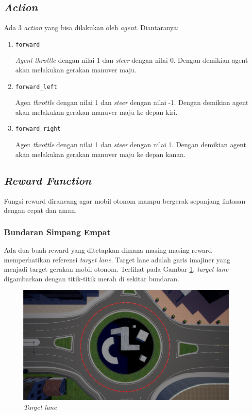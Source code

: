 \documentclass[conference]{IEEEtran}
\begin{document}
\subsection{\textit{Action}}
\label{sec:action}
Ada 3 \textit{action} yang bisa dilakukan oleh \textit{agent}. Diantaranya:

\begin{enumerate}[nolistsep]
	\item \verb=forward=
	
	\textit{Agent} \textit{throttle} dengan nilai 1 dan \textit{steer} dengan nilai 0. Dengan demikian agent akan melakukan gerakan manuver maju.
	
	\item \verb=forward_left=
	
	Agen \textit{throttle} dengan nilai 1 dan \textit{steer} dengan nilai -1. Dengan demikian agent akan melakukan gerakan manuver maju ke depan kiri.
	
	\item \verb=forward_right=
	
	Agen \textit{throttle} dengan nilai 1 dan \textit{steer} dengan nilai 1. Dengan demikian agent akan melakukan gerakan manuver maju ke depan kanan.
	
\end{enumerate}

\subsection{\textit{Reward Function}}
\label{sec:sistem_reward}

Fungsi reward dirancang agar mobil otonom mampu bergerak sepanjang lintasan dengan cepat dan aman.

\subsubsection{Bundaran Simpang Empat}Ada dua buah reward yang ditetapkan dimana masing-masing reward memperhatikan referensi \textit{target lane}. Target lane adalah garis imajiner yang menjadi target gerakan mobil otonom. Terlihat pada Gambar \ref{fig:target_lane_line}, \textit{target lane} digambarkan dengan titik-titik merah di sekitar bundaran.

\begin{figure}[H] 
	\centering
	\includegraphics[width=1\linewidth]{images/target_lane_line}
	\caption{\textit{Target lane}}
	\label{fig:target_lane_line}
\end{figure}
\end{document}
